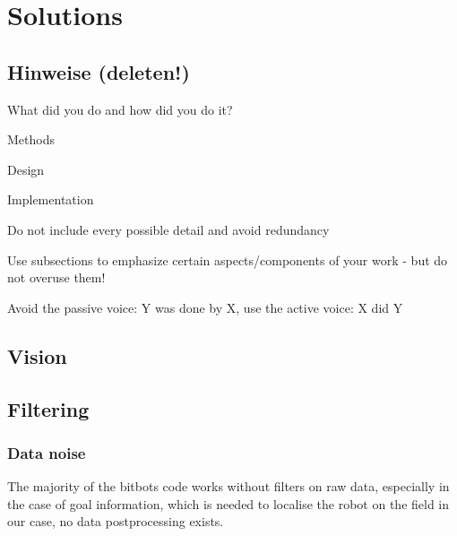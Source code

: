 \documentclass[lnicst,a4paper]{svmultln}
\begin{document}

\section{Solutions}


\subsection{Hinweise (deleten!)}
What did you do and how did you do it?

Methods

Design

Implementation

Do not include every possible detail and avoid redundancy

Use subsections to emphasize certain aspects/components of
your work -
but do not overuse them!

Avoid the passive voice: Y was done by X, use the active voice: X did Y





\subsection{Vision}





\subsection{Filtering}

\subsubsection{Data noise}
The majority of the bitbots code works without filters on raw data, especially in the case of goal information, which is needed to localise the robot on the field in our case, no data postprocessing exists.
\end{document}
